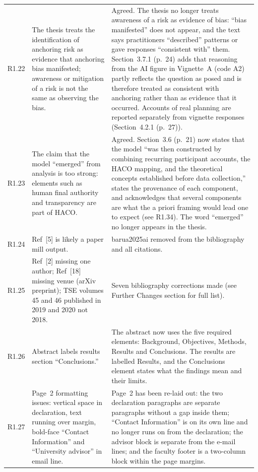 \documentclass[12pt,a4paper,twoside]{article}
\begin{document}
{\begin{longtable}{p{1cm}p{6.7cm}p{7cm}}
R1.22 &
The thesis treats the identification of anchoring risk as evidence that anchoring bias manifested; awareness or mitigation of a risk is not the same as observing the bias. &
Agreed. The thesis no longer treats awareness of a risk as evidence of bias: ``bias manifested'' does not appear, and the text says practitioners ``described'' patterns or gave responses ``consistent with'' them. Section~3.7.1 (p.~24) adds that reasoning from the AI figure in Vignette~A (code A2) partly reflects the question as posed and is therefore treated as consistent with anchoring rather than as evidence that it occurred. Accounts of real planning are reported separately from vignette responses (Section~4.2.1 (p.~27)). \\

R1.23 &
The claim that the model ``emerged'' from analysis is too strong: elements such as human final authority and transparency are part of HACO. &
Agreed. Section~3.6 (p.~21) now states that the model ``was then constructed by combining recurring participant accounts, the HACO mapping, and the theoretical concepts established before data collection,'' states the provenance of each component, and acknowledges that several components are what the a priori framing would lead one to expect (see R1.34). The word ``emerged'' no longer appears in the thesis. \\

R1.24 &
Ref~[5] is likely a paper mill output. &
barua2025ai removed from the bibliography and all citations. \\

R1.25 &
Ref~[2] missing one author; Ref~[18] missing venue (arXiv preprint); TSE volumes 45
and 46 published in 2019 and 2020 not 2018. &
Seven bibliography corrections made (see Further Changes section for full list). \\

R1.26 &
Abstract labels results section ``Conclusions.'' &
The abstract now uses the five required elements: Background, Objectives, Methods, Results and Conclusions. The results are labelled Results, and the Conclusions element states what the findings mean and their limits. \\

R1.27 &
Page~2 formatting issues: vertical space in declaration, text running over margin,
bold-face ``Contact Information'' and ``University advisor'' in email line. &
Page~2 has been re-laid out: the two declaration paragraphs are separate paragraphs without a gap inside them; ``Contact Information'' is on its own line and no longer runs on from the declaration; the advisor block is separate from the e-mail lines; and the faculty footer is a two-column block within the page margins. \\


\end{longtable}}
\end{document}
